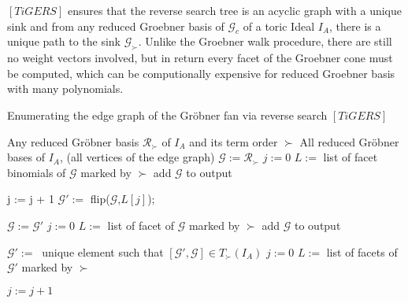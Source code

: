 $[TiGERS] $ ensures that the reverse search tree is an acyclic graph with a unique sink and from any reduced Groebner basis of $\mathcal{G}_{c} $ of a toric Ideal $I_{A}$, there is a unique path to the sink $\mathcal{G}_{\succ} $.
Unlike the Groebner walk procedure, there are still no weight vectors involved, but in return every facet of the Groebner cone must be computed, which can be computionally expensive for reduced Groebner basis with many polynomials.

\begin{algorithm}
\caption{Enumerating the edge graph of the Gröbner fan via reverse search $\left[ TiGERS\right]  $}
\label{alg:reverse}
\begin{algorithmic}[1]

\Require
Any reduced Gröbner basis $ \mathcal{R}_{\succ} $ of $I_A$ and its term order $\succ$
\Ensure All reduced Gröbner bases of $I_A$, (all vertices of the edge graph)
\State $\mathcal{G} := \mathcal{R}_{\succ} $
\State $j := 0$
\State $L := $ list of facet binomials of $\mathcal{G}$ marked by $\succ$
\State add $\mathcal{G}$ to output
\Repeat
{}

\State j := j + 1
\State $\mathcal{G}':= $ flip($\mathcal{G}$,$L[j]$);

\State $\mathcal{G} := \mathcal{G}' $  
\State $ j := 0$
\State $ L := $ list of facet of $\mathcal{G}$ marked by $\succ$
\State add $ \mathcal{G}$ to output

\EndIf 

\EndWhile

\State $\mathcal{G}' :=~$ unique element such that $[\mathcal{G}',\mathcal{G}] \in T_{\succ}(I_{A}) $
\State $j := 0$
\State $L := $ list of facets of $\mathcal{G}'$ marked by $\succ$

\Repeat
\State $j := j + 1$

\EndIf



\end{algorithmic}
\end{algorithm}

